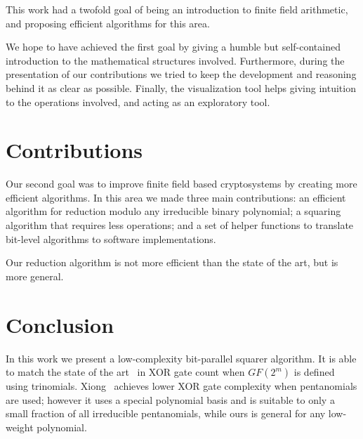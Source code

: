 


This work had a twofold goal of being an introduction to finite field arithmetic, and proposing efficient algorithms for this area.

We hope to have achieved the first goal by giving a humble but self-contained introduction to the mathematical structures involved. Furthermore, during the presentation of our contributions we tried to keep the development and reasoning behind it as clear as possible. Finally, the visualization tool helps giving intuition to the operations involved, and acting as an exploratory tool.

\section{Contributions}

Our second goal was to improve finite field based cryptosystems by creating more efficient algorithms. In this area we made three main contributions: an efficient algorithm for reduction modulo any irreducible binary polynomial; a squaring algorithm that requires less operations; and a set of helper functions to translate bit-level algorithms to software implementations.

Our reduction algorithm is not more efficient than the state of the art, but is more general.

\section{Conclusion} \label{conclusion}

In this work we present a low-complexity bit-parallel squarer algorithm. It is able to match the state of the art~\cite{wu2002bit} in XOR gate count when $GF(2^m)$ is defined using trinomials. Xiong~\cite{xiong2014gf} achieves lower XOR gate complexity when pentanomials are used; however it uses a special polynomial basis and is suitable to only a small fraction of all irreducible pentanomials, while ours is general for any low-weight polynomial.\\


